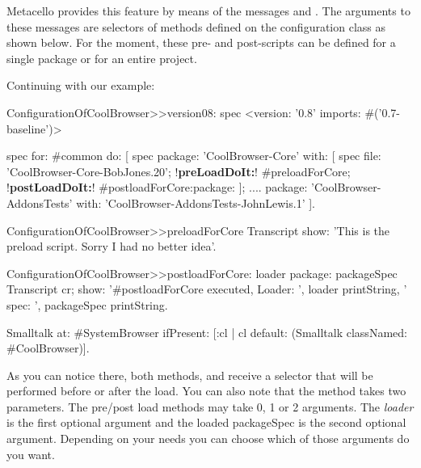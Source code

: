 \documentclass[a4paper,10pt,twoside]{book}
\begin{document}
Metacello provides this feature by means of the messages  and .  The arguments to these messages are selectors of methods defined on the configuration class as shown below. For the moment, these pre- and post-scripts can be defined for a single package or for an entire project.

Continuing with our example:

\begin{code}{}
ConfigurationOfCoolBrowser>>version08: spec
       <version: '0.8' imports: #('0.7-baseline')>

       spec for: #common do: [
              spec
                     package: 'CoolBrowser-Core' with: [
                            spec
                                   file: 'CoolBrowser-Core-BobJones.20';
                                   !\textbf{preLoadDoIt:}! #preloadForCore;
                                   !\textbf{postLoadDoIt:}! #postloadForCore:package: ];
                     ....
                     package: 'CoolBrowser-AddonsTests' with: 'CoolBrowser-AddonsTests-JohnLewis.1' ].
\end{code}

\begin{code}{}
ConfigurationOfCoolBrowser>>preloadForCore
         Transcript show: 'This is the preload script. Sorry I had no better idea'.
\end{code}

\begin{code}{}
ConfigurationOfCoolBrowser>>postloadForCore: loader package: packageSpec
       Transcript cr;
              show: '#postloadForCore executed, Loader: ', loader printString,
                     ' spec: ', packageSpec printString.

       Smalltalk at: #SystemBrowser ifPresent: [:cl | cl default: (Smalltalk classNamed: #CoolBrowser)].
\end{code}

As you can notice there, both methods,  and  receive a selector that will be performed before or after the load. You can also note that the method   takes two parameters. The pre/post load methods may take 0, 1 or 2 arguments. The {\em loader} %
is the first optional argument and the loaded packageSpec is the second optional argument. Depending on your needs you can choose which of those arguments do you want.
\end{document}
